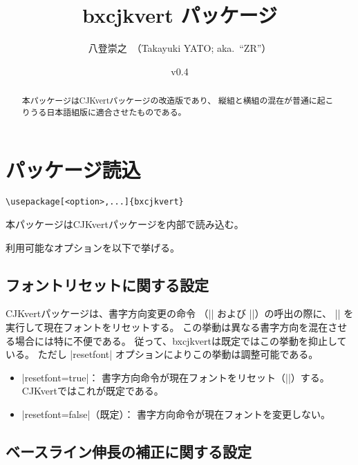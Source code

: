 \documentclass[a4paper]{ltjsarticle}
\newcommand{\PkgVersion}{0.4}
\newcommand{\PkgDate}{2016/11/11}
\newcommand{\Pkg}[1]{\textsf{#1}}
\newcommand{\Means}{：\quad}
\begin{document}
\title{\Pkg{bxcjkvert} パッケージ}
\author{八登崇之\ （Takayuki YATO; aka.~``ZR''）}
\date{v\PkgVersion\quad[\PkgDate]}
\maketitle

\begin{abstract}
本パッケージは\Pkg{CJKvert}パッケージの改造版であり、
縦組と横組の混在が普通に起こりうる日本語組版に適合させたものである。
\end{abstract}

\tableofcontents

\section{パッケージ読込}
\label{sec:loading}

\begin{verbatim}
\usepackage[<option>,...]{bxcjkvert}
\end{verbatim}

本パッケージは\Pkg{CJKvert}パッケージを内部で読み込む。

利用可能なオプションを以下で挙げる。

\subsection{フォントリセットに関する設定}

\Pkg{CJKvert}パッケージは、書字方向変更の命令
（|\CJKhorz| および |\CJKvert|）の呼出の際に、
|\normalfont| を実行して現在フォントをリセットする。
この挙動は異なる書字方向を混在させる場合には特に不便である。
従って、\Pkg{bxcjkvert}は既定ではこの挙動を抑止している。
ただし |resetfont| オプションによりこの挙動は調整可能である。

\begin{itemize}
\item |resetfont=true|\Means
  書字方向命令が現在フォントをリセット（|\normalfont|）する。
  \Pkg{CJKvert}ではこれが既定である。
\item |resetfont=false|（既定）\Means
  書字方向命令が現在フォントを変更しない。
\end{itemize}

\subsection{ベースライン伸長の補正に関する設定}
\end{document}
